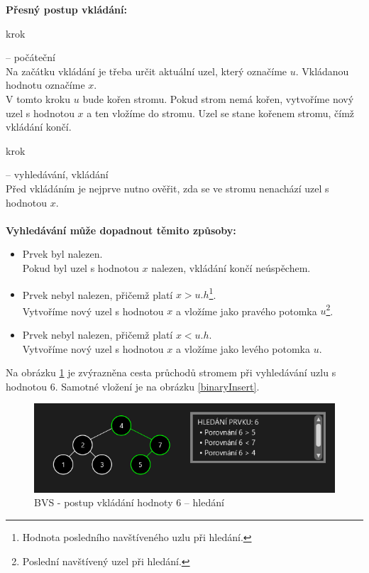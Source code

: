 \documentclass[
  biblatex=false,
  font=serif,
  glossaries=false,
  tables=false,
  theorems=false,
  index
]{kidiplom}
\makeatletter
\newcommand\footnoteref[1]{\protected@xdef\@thefnmark{\ref{#1}}\@footnotemark}
\makeatother
\begin{document}
\noindent \textbf{Přesný postup vkládání:}
\begin{enumerate} {\bfseries
\item  krok} -- počáteční \\
Na začátku vkládání je třeba určit aktuální uzel, který označíme $u$. Vkládanou hodnotu označíme $x$.\\
V tomto kroku $u$ bude kořen stromu. Pokud strom nemá kořen, vytvoříme nový uzel s hodnotou $x$ a ten vložíme do stromu. Uzel se stane kořenem stromu, čímž vkládání končí.
{\bfseries\item  krok} -- vyhledávání, vkládání \\
Před vkládáním je nejprve nutno ověřit, zda se ve stromu nenachází uzel s hodnotou $x$.\\\\
\textbf{Vyhledávání může dopadnout těmito způsoby:}
\begin{itemize}
\item Prvek byl nalezen. \\
Pokud byl uzel s hodnotou $x$ nalezen, vkládání končí neúspěchem.
\item Prvek nebyl nalezen, přičemž platí $x > u.h$\footnote{\label{hodnotaPosledniho}Hodnota posledního navštíveného uzlu při hledání.}.\\
Vytvoříme nový uzel s hodnotou $x$ a vložíme jako pravého potomka $u$\footnote{\label{posledni}Poslední navštívený uzel při hledání.}.
\item Prvek nebyl nalezen, přičemž platí $x < u.h$\footnoteref{hodnotaPosledniho}.\\
Vytvoříme nový uzel s hodnotou $x$ a vložíme jako levého potomka $u$\footnoteref{posledni}.
\end{itemize}
\end{enumerate}

\medskip
\noindent Na obrázku \ref{binarySearchInsert} je zvýrazněna cesta průchodů stromem při vyhledávání uzlu s hodnotou 6. Samotné vložení je na obrázku \ref{binaryInsert}.

\begin{figure}[h!]
\centering
	\includegraphics[scale=0.9]{obrazky/6BinarniVkladani1.png}
	\caption{BVS - postup vkládání hodnoty 6 -- hledání}
	\label{binarySearchInsert}
\end{figure}
\end{document}
